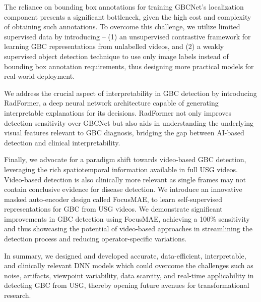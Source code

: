 \par The reliance on bounding box annotations for training GBCNet's localization component presents a significant bottleneck, given the high cost and complexity of obtaining such annotations. To overcome this challenge, we utilize limited supervised data by introducing -- (1) an unsupervised contrastive framework for learning GBC representations from unlabelled videos, and (2) a weakly supervised object detection technique to use only image labels instead of bounding box annotation requirements, thus designing more practical models for real-world deployment. 

\par We address the crucial aspect of interpretability in GBC detection by introducing RadFormer, a deep neural network architecture capable of generating interpretable explanations for its decisions. RadFormer not only improves detection sensitivity over GBCNet but also aids in understanding the underlying visual features relevant to GBC diagnosis, bridging the gap between AI-based detection and clinical interpretability. 

\par Finally, we advocate for a paradigm shift towards video-based GBC detection, leveraging the rich spatiotemporal information available in full USG videos. Video-based detection is also clinically more relevant as single frames may not contain conclusive evidence for disease detection. We introduce an innovative masked auto-encoder design called FocusMAE, to learn self-supervised representations for GBC from USG videos. We demonstrate significant improvements in GBC detection using FocusMAE, achieving a 100\% sensitivity and thus showcasing the potential of video-based approaches in streamlining the detection process and reducing operator-specific variations.

\par In summary, we designed and developed accurate, data-efficient, interpretable, and clinically relevant DNN models which could overcome the challenges such as noise, artifacts, viewpoint variability, data scarcity, and real-time applicability in detecting GBC from USG, thereby opening future avenues for transformational research.


